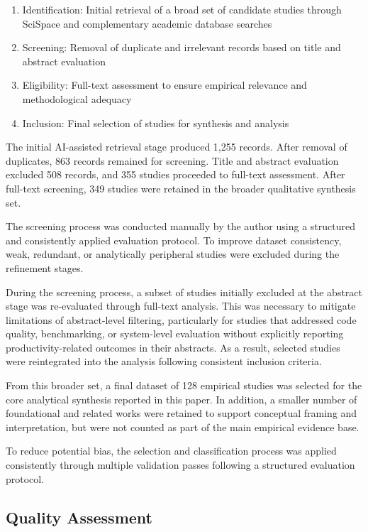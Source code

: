 \documentclass[conference]{IEEEtran}
\begin{document}
\begin{enumerate}
    \item Identification: Initial retrieval of a broad set of candidate studies through SciSpace and complementary academic database searches
    \item Screening: Removal of duplicate and irrelevant records based on title and abstract evaluation
    \item Eligibility: Full-text assessment to ensure empirical relevance and methodological adequacy
    \item Inclusion: Final selection of studies for synthesis and analysis
\end{enumerate}

The initial AI-assisted retrieval stage produced 1,255 records. After removal of duplicates, 863 records remained for screening. Title and abstract evaluation excluded 508 records, and 355 studies proceeded to full-text assessment. After full-text screening, 349 studies were retained in the broader qualitative synthesis set.

The screening process was conducted manually by the author using a structured and consistently applied evaluation protocol. To improve dataset consistency, weak, redundant, or analytically peripheral studies were excluded during the refinement stages.

During the screening process, a subset of studies initially excluded at the abstract stage was re-evaluated through full-text analysis. This was necessary to mitigate limitations of abstract-level filtering, particularly for studies that addressed code quality, benchmarking, or system-level evaluation without explicitly reporting productivity-related outcomes in their abstracts. As a result, selected studies were reintegrated into the analysis following consistent inclusion criteria.

From this broader set, a final dataset of 128 empirical studies was selected for the core analytical synthesis reported in this paper. In addition, a smaller number of foundational and related works were retained to support conceptual framing and interpretation, but were not counted as part of the main empirical evidence base.

To reduce potential bias, the selection and classification process was applied consistently through multiple validation passes following a structured evaluation protocol.

\subsection{Quality Assessment}
\end{document}
